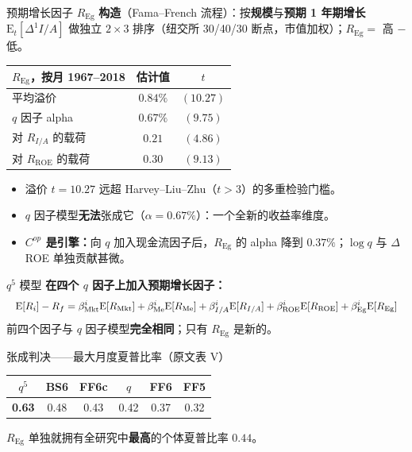 \documentclass{beamer}
\begin{document}
\begin{frame}{预期增长因子 $R_{\text{Eg}}$}
	\textbf{构造}（Fama--French 流程）：按\textbf{规模}与\textbf{预期 1 年期增长} $\mathrm{E}_t[\Delta^1 I/A]$ 做独立 $2\times3$ 排序（纽交所 30/40/30 断点，市值加权）；$R_{\text{Eg}}=$ 高 $-$ 低。
	\begin{center}
		\small
		\begin{tabular}{@{}lcc@{}}
			\toprule
			$R_{\text{Eg}}$，按月 1967--2018 & 估计值 & $t$ \\
			\midrule
			平均溢价                       & $0.84\%$ & $(10.27)$ \\
			$q$ 因子 alpha                 & $0.67\%$ & $(9.75)$ \\
			\quad 对 $R_{I/A}$ 的载荷       & $0.21$   & $(4.86)$ \\
			\quad 对 $R_{\text{ROE}}$ 的载荷 & $0.30$   & $(9.13)$ \\
			\bottomrule
		\end{tabular}
	\end{center}
	\begin{itemize}
		\item 溢价 $t=10.27$ 远超 Harvey--Liu--Zhu（$t>3$）的多重检验门槛。
		\item $q$ 因子模型\textbf{无法}张成它（$\alpha=0.67\%$）：一个全新的收益率维度。
		\item \textbf{$C^{op}$ 是引擎：}向 $q$ 加入现金流因子后，$R_{\text{Eg}}$ 的 alpha 降到 $0.37\%$；$\log q$ 与 $\Delta$ROE 单独贡献甚微。
	\end{itemize}
\end{frame}

\begin{frame}{$q^5$ 模型}
	\textbf{在四个 $q$ 因子上加入预期增长因子：}
	\begin{equation}\label{equ:q5model}
		\resizebox{\linewidth}{!}{$\displaystyle
		\mathrm{E}[R_i]-R_f=\beta^i_{\text{Mkt}}\mathrm{E}[R_{\text{Mkt}}]+\beta^i_{\text{Me}}\mathrm{E}[R_{\text{Me}}]+\beta^i_{I/A}\mathrm{E}[R_{I/A}]+\beta^i_{\text{ROE}}\mathrm{E}[R_{\text{ROE}}]+\beta^i_{\text{Eg}}\mathrm{E}[R_{\text{Eg}}]
		$}
	\end{equation}
	前四个因子与 $q$ 因子模型\textbf{完全相同}；只有 $R_{\text{Eg}}$ 是新的。
	\begin{block}{张成判决——最大月度夏普比率（原文表 V）}
		\begin{center}
			\small
			\begin{tabular}{@{}cccccc@{}}
				\toprule
				$q^5$ & BS6 & FF6c & $q$ & FF6 & FF5 \\
				\midrule
				\textbf{0.63} & 0.48 & 0.43 & 0.42 & 0.37 & 0.32 \\
				\bottomrule
			\end{tabular}
		\end{center}
		$R_{\text{Eg}}$ 单独就拥有全研究中\textbf{最高}的个体夏普比率 $0.44$。
	\end{block}
\end{frame}
\end{document}
